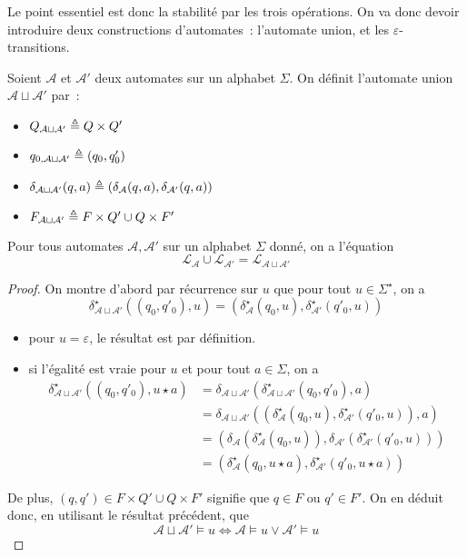 Le point essentiel est donc la stabilité par les trois opérations. On va donc
devoir introduire deux constructions d'automates~: l'automate union, et les
$\varepsilon$-transitions.

\begin{definition}
  Soient $\mathcal A$ et $\mathcal A'$ deux automates sur un alphabet $\Sigma$.
  On définit l'automate union $\mathcal A \sqcup \mathcal A'$ par~:
  \begin{itemize}
  \item $Q_{\mathcal A\sqcup \mathcal A'} \triangleq Q\times Q'$
  \item $q_{0,\mathcal A\sqcup \mathcal A'} \triangleq (q_0,q'_0)$
  \item $\delta_{\mathcal A \sqcup \mathcal A'}(q,a) \triangleq (\delta_{\mathcal A}(q,a),
    \delta_{\mathcal A'}(q,a))$
  \item $F_{\mathcal A \sqcup \mathcal A'} \triangleq F\times Q' \cup Q\times F'$
  \end{itemize}
\end{definition}

\begin{proposition}\label{prop.union.ratio}
  Pour tous automates $\mathcal A, \mathcal A'$ sur un alphabet $\Sigma$ donné,
  on a l'équation
  \[\mathcal L_{\mathcal A} \cup \mathcal L_{\mathcal A'} =
  \mathcal L_{\mathcal A \sqcup \mathcal A'}\]
\end{proposition}

\begin{proof}
  On montre d'abord par récurrence sur $u$ que pour tout $u \in \Sigma^\star$,
  on a
  \[\delta_{\mathcal A\sqcup\mathcal A'}^\star((q_0,q'_0),u) =
  (\delta_\mathcal A^\star(q_0,u),\delta_{\mathcal A'}^\star(q'_0,u))\]
  \begin{itemize}
  \item pour $u = \varepsilon$, le résultat est par définition.
  \item si l'égalité est vraie pour $u$ et pour tout $a \in \Sigma$, on a
    \begin{align*}
      \delta_{\mathcal A\sqcup\mathcal A'}^\star ((q_0,q'_0),u\star a) &=
      \delta_{\mathcal A\sqcup \mathcal A'}(
      \delta_{\mathcal A\sqcup \mathcal A'}^\star(q_0,q'_0),a)\\
      &= \delta_{\mathcal A\sqcup\mathcal A'}(
      (\delta_\mathcal A^\star(q_0,u),\delta_{\mathcal A'}^\star(q'_0,u)),a)\\
      &= (\delta_\mathcal A(\delta_\mathcal A^\star(q_0,u)),\delta_{\mathcal A'}(
      \delta_{\mathcal A'}^\star(q'_0,u)))\\
      &= (\delta_\mathcal A^\star(q_0,u\star a),
      \delta_{\mathcal A'}^\star(q'_0,u\star a))
    \end{align*}
  \end{itemize}

  De plus, $(q,q') \in F\times Q' \cup Q\times F'$ signifie que $q \in F$ ou
  $q' \in F'$. On en déduit donc, en utilisant le résultat précédent, que
  \[\mathcal A \sqcup \mathcal A'\models u \iff
  \mathcal A \models u \lor \mathcal A'\models u\]
\end{proof}


